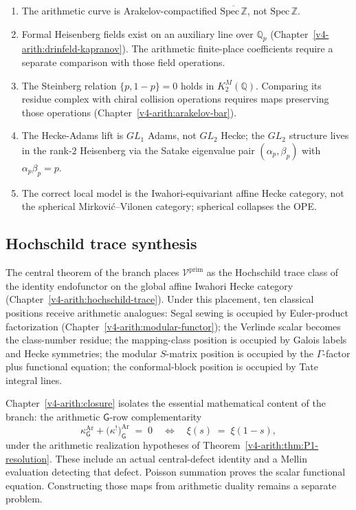 \begin{enumerate}
\item The arithmetic curve is Arakelov-compactified
\(\overline{\mathrm{Spec}\,\mathbb{Z}}\), not \(\mathrm{Spec}\,\mathbb{Z}\).
\item Formal Heisenberg fields exist on an auxiliary line over
\(\mathbb Q_p\) (Chapter~\ref{v4-arith:drinfeld-kapranov}).
The arithmetic finite-place coefficients require a separate
comparison with those field operations.
\item The Steinberg relation \(\{p,1-p\}=0\) holds in
\(K_2^M(\mathbb Q)\). Comparing its residue complex with chiral
collision operations requires maps preserving those operations
(Chapter~\ref{v4-arith:arakelov-bar}).
\item The Hecke-Adams lift is \(GL_{1}\) Adams, not \(GL_{2}\) Hecke;
the \(GL_{2}\) structure lives in the rank-\(2\) Heisenberg via the
Satake eigenvalue pair \((\alpha_{p},\beta_{p})\) with
\(\alpha_{p}\beta_{p}=p\).
\item The correct local model is the Iwahori-equivariant affine
Hecke category, not the spherical Mirkovi\'c--Vilonen category;
spherical collapses the OPE.
\end{enumerate}

\subsection*{Hochschild trace synthesis}

The central theorem of the branch places
\(\mathcal{V}^{\mathrm{prim}}\) as the Hochschild trace class of the
identity endofunctor on the global affine Iwahori Hecke category
(Chapter~\ref{v4-arith:hochschild-trace}). Under this placement,
ten classical positions receive arithmetic analogues: Segal sewing
is occupied by Euler-product factorization (Chapter~\ref{v4-arith:modular-functor});
the Verlinde scalar becomes the class-number residue; the mapping-class
position is occupied by Galois labels and Hecke symmetries; the modular
\(S\)-matrix position is occupied by the \(\Gamma\)-factor plus functional
equation; the conformal-block position is occupied by Tate integral lines.

Chapter~\ref{v4-arith:closure} isolates the
essential mathematical content of the branch: the arithmetic
\(\mathsf{G}\)-row complementarity
\[
\kappa^{\mathrm{Ar}}_{\mathsf{G}}
+\bigl(\kappa^{!}\bigr)^{\mathrm{Ar}}_{\mathsf{G}}
\;=\;0
\quad\Longleftrightarrow\quad
\xi(s)\;=\;\xi(1-s),
\]
under the arithmetic realization hypotheses of
Theorem~\ref{v4-arith:thm:P1-resolution}. These include an actual
central-defect identity and a Mellin evaluation detecting that defect.
Poisson summation proves the scalar functional equation. Constructing
those maps from arithmetic duality remains a separate problem.


